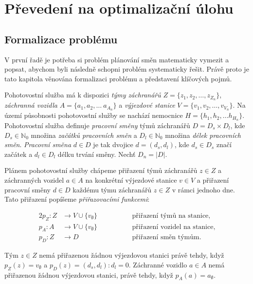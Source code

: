 \chapter{Převedení na optimalizační úlohu}

\section{Formalizace problému}\label{kap:formalizaceProblemu}

V první řadě je potřeba si problém plánování směn matematicky vymezit a popsat, abychom byli následně schopni problém systematicky řešit. 
Právě proto je tato kapitola věnována formalizaci problému a představení klíčových pojmů. 

Pohotovostní služba má k dispozici \textit{týmy záchranářů} $Z = \{ z_1, z_2, \dots, z_{Z_n} \}$, \textit{záchranná vozidla} $A = \{ a_1, a_2, \dots\ a_{A_n} \}$
a \textit{výjezdové stanice} $V = \{ v_1, v_2, \dots, v_{V_n} \}$. 
Na území působnosti pohotovostní služby se nachází nemocnice $H = \{ h_1, h_2, \dots h_{H_n} \}$.
Pohotovostní služba definuje \textit{pracovní směny} týmů záchranářů $D = D_{s} \times D_{l}$, 
kde $D_{s} \in \mathbb{N}_0$ množina \textit{začátků pracovních směn} a $D_{l} \in \mathbb{N}_0$ množina \textit{délek pracovních směn}.
\textit{Pracovní směna} $d \in D$ je tak dvojice $d = (d_s, d_l)$, kde $d_{s} \in D_{s}$ značí začátek a $d_{l} \in D_{l}$ délku trvání směny.
Nechť $D_n = |D|$.

Plánem pohotovostní služby chápeme přiřazení týmů záchranářů $z \in Z$ a záchranných vozidel $a \in A$ na konkrétní výjezdové stanice $v \in V$
a přiřazení pracovní směny $d \in D$ každému týmu záchranářů $z \in Z$ v rámci jednoho dne.
Tato přiřazení popíšeme \textit{přiřazovacími funkcemi}:
\begin{definice}
  \begin{alignat*}{2}
    p_Z \colon Z &\rightarrow V \cup \{ v_{\emptyset} \} \quad && \hspace{30pt} \text{přiřazení týmů na stanice}, \\
    p_A \colon A &\rightarrow V \cup \{ v_{\emptyset} \} \quad && \hspace{30pt} \text{přiřazení vozidel na stanice}, \\ 
    p_{D} \colon Z &\rightarrow D                        \quad && \hspace{30pt} \text{přiřazení směn týmům}.
  \end{alignat*}
\end{definice}
Tým $z \in Z$ nemá přiřazenou žádnou výjezdovou stanici právě tehdy, když
$p_{Z}(z) = v_{\emptyset}$ a $p_{D}(z) = (d_s, d_l) \colon d_l = 0$.
Záchranné vozidlo $a \in A$ nemá přiřazenou žádnou výjezdovou stanici, právě tehdy, když $p_{A}(a) = a_{\emptyset}$.

